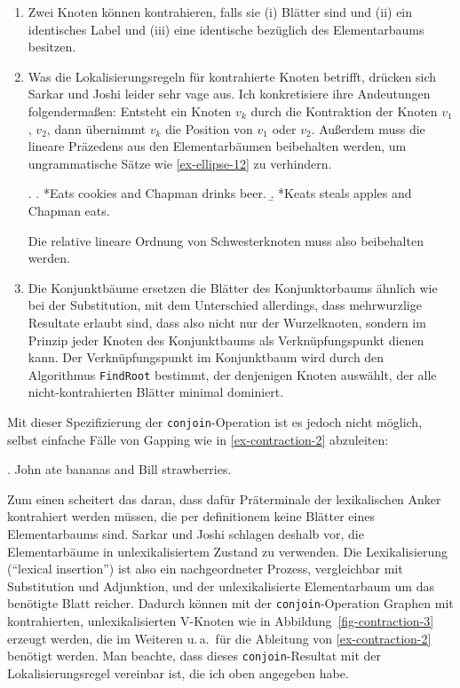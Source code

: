 \begin{enumerate}
  \item Zwei Knoten können kontrahieren, falls sie (i) Blätter sind und (ii) ein identisches Label und (iii) eine identische  bezüglich des Elementarbaums besitzen.
  \item Was die Lokalisierungsregeln für kontrahierte Knoten betrifft, drücken sich Sarkar und Joshi leider sehr vage aus. Ich konkretisiere ihre Andeutungen folgenderma\ss en: Entsteht ein Knoten $v_k$ durch die Kontraktion der Knoten $v_1$, $v_2$, dann übernimmt $v_k$ die Position von $v_1$ oder $v_2$. Au\ss erdem muss die lineare Präzedens aus den Elementarbäumen beibehalten werden, um ungrammatische Sätze wie \ref{ex-ellipse-12} zu verhindern.

\ex.\label{ex-ellipse-12}
\a. *Eats cookies and Chapman drinks beer.
\b. *Keats steals apples and Chapman eats.

Die relative lineare Ordnung von Schwesterknoten muss also beibehalten werden. 
\item Die Konjunktbäume ersetzen die Blätter des Konjunktorbaums ähnlich wie bei der Substitution, mit dem Unterschied allerdings, dass mehrwurzlige Resultate erlaubt sind, dass also nicht nur der Wurzelknoten, sondern im Prinzip jeder Knoten des Konjunktbaums als Verknüpfungspunkt dienen kann. Der Verknüpfungspunkt im Konjunktbaum wird durch den Algorithmus {\tt FindRoot} bestimmt, der denjenigen Knoten auswählt, der alle nicht-kontrahierten Blätter minimal dominiert. 
\end{enumerate} 

Mit dieser Spezifizierung der {\tt conjoin}-Operation ist es jedoch nicht möglich, selbst einfache Fälle von Gapping wie in \ref{ex-contraction-2} abzuleiten:

\ex. \label{ex-contraction-2}John ate bananas and Bill strawberries. 

Zum einen scheitert das daran, dass dafür Präterminale der lexikalischen Anker kontrahiert werden müssen, die per definitionem keine Blätter eines Elementarbaums sind. Sarkar und Joshi schlagen deshalb vor, die Elementarbäume in unlexikalisiertem Zustand zu verwenden. Die Lexikalisierung ("`lexical insertion"') ist also ein nachgeordneter Prozess, vergleichbar mit Substitution und Adjunktion, und der unlexikalisierte Elementarbaum um das benötigte Blatt reicher. Dadurch können mit der {\tt conjoin}-Operation Graphen mit kontrahierten, unlexikalisierten V-Knoten wie in Abbildung~\ref{fig-contraction-3} erzeugt werden, die im Weiteren u.\,a.\ für die Ableitung von \ref{ex-contraction-2} benötigt werden. Man beachte, dass dieses {\tt conjoin}-Resultat mit der Lokalisierungsregel vereinbar ist, die ich oben angegeben habe.

